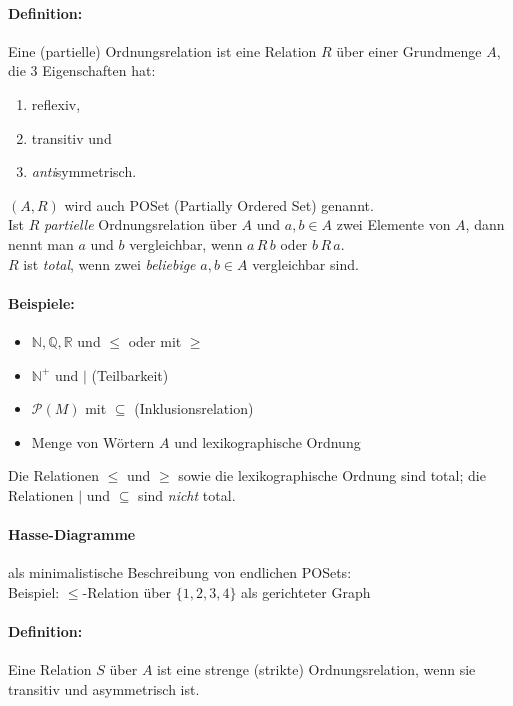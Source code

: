 \paragraph{Definition:}Eine (partielle) Ordnungsrelation ist eine Relation $R$ über einer Grundmenge $A$, die $3$ Eigenschaften hat:
\begin{enumerate}
\item reflexiv,
\item transitiv und
\item \emph{anti}symmetrisch.
\end{enumerate}
$(A,R)$ wird auch POSet (Partially Ordered Set) genannt.\\
Ist $R$ \emph{partielle} Ordnungsrelation über $A$ und $a,b \in A$ zwei Elemente von $A$, dann nennt man $a$ und $b$ vergleichbar, wenn $a\, R\, b$ oder $b\, R\, a$.\\
$R$ ist \emph{total}, wenn zwei \emph{beliebige} $a,b\in A$ vergleichbar sind.

\paragraph{Beispiele:}
\begin{itemize}
\item $\mathbb{N,Q,R}$ und $\leq$ oder mit $\geq$
\item $\mathbb{N}^+$ und $|$ (Teilbarkeit)
\item $\mathcal{P}(M)$ mit $\subseteq$ (Inklusionsrelation)
\item Menge von Wörtern $A$ und lexikographische Ordnung
\end{itemize}
Die Relationen $\leq$ und $\geq$ sowie die lexikographische Ordnung sind total; die Relationen $|$ und $\subseteq$ sind \emph{nicht} total.

\paragraph{Hasse-Diagramme}als minimalistische Beschreibung von endlichen POSets:\\
Beispiel: $\leq$-Relation über $\{1,2,3,4\}$ als gerichteter Graph

\paragraph{Definition:} Eine Relation $S$ über $A$ ist eine strenge (strikte) Ordnungsrelation, wenn sie transitiv und asymmetrisch ist.

